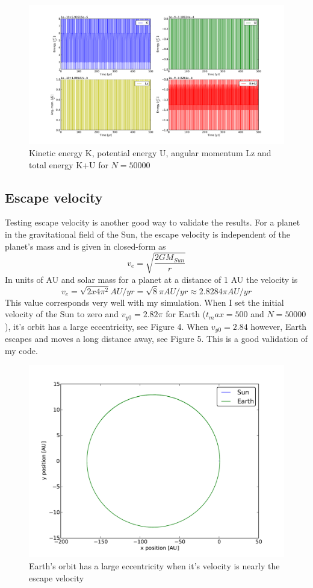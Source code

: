 \documentclass[a4paper,12pt, english]{article}
\begin{document}
\begin{figure}[!h]
\centering
\includegraphics[scale = 0.5]{Fig3.pdf}
\caption{Kinetic energy K, potential energy U, angular momentum Lz and total energy K+U for $N=50000$}
\end{figure} 

\subsection*{Escape velocity}
Testing escape velocity is another good way to validate the results. For a planet in the gravitational field of the Sun, the escape velocity is independent of the planet's mass and is given in closed-form as
\[
v_e = \sqrt{\frac{2GM_{Sun}}{r}}
\]
In units of AU and solar mass for a planet at a distance of 1 AU the velocity is
\[
v_e = \sqrt{2x4\pi^2} AU/yr = \sqrt{8}\pi AU/yr \approx 2.8284\pi AU/yr
\]
This value corresponds very well with my simulation. When I set the initial velocity of the Sun to zero and $v_{y0} = 2.82\pi$ for Earth ($t_max = 500$ and $N = 50000$), it's orbit has a large eccentricity, see Figure 4. When $v_{y0} = 2.84$ however, Earth escapes and moves a long distance away, see Figure 5. This is a good validation of my code. 

\begin{figure}[!h]
\centering
\includegraphics[scale = 0.5]{Fig4.pdf}
\caption{Earth's orbit has a large eccentricity when it's velocity is nearly the escape velocity}
\end{figure} 
\end{document}
